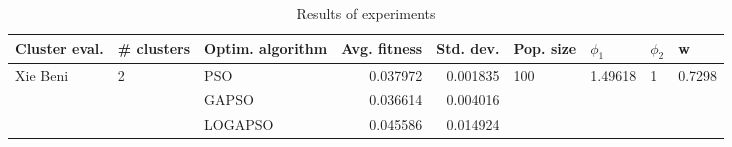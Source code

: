 \begin{table}
\centering
\caption{Results of experiments}
\begin{tabular}{lllrrllll}
\toprule
            Cluster eval. &        \# clusters & Optim. algorithm &  Avg. fitness &  Std. dev. &            Pop. size &               $\phi_{1}$ &         $\phi_{2}$ &                       w \\
\midrule
\multirow{3}{*}{Xie Beni} & \multirow{3}{*}{2} &              PSO &      0.037972 &   0.001835 & \multirow{3}{*}{100} & \multirow{3}{*}{1.49618} & \multirow{3}{*}{1} & \multirow{3}{*}{0.7298} \\
                          &                    &            GAPSO &      0.036614 &   0.004016 &                      &                          &                    &                         \\
                          &                    &          LOGAPSO &      0.045586 &   0.014924 &                      &                          &                    &                         \\
\bottomrule
\end{tabular}
\end{table}
